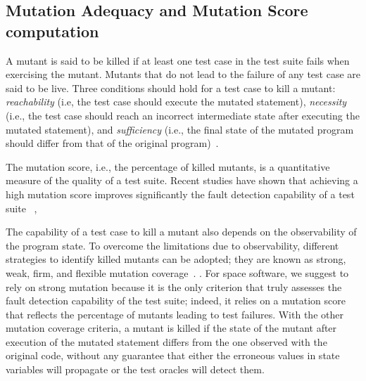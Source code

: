 \subsection{Mutation Adequacy and Mutation Score computation}
\label{background:adequacy}
A mutant is said to be killed if at least one test case in the test suite fails when exercising the mutant.
Mutants that do not lead to the failure of any test case are said to be live.
Three conditions should hold for a test case to kill a mutant: \emph{reachability} (i.e, the test case should execute the mutated statement), \emph{necessity} (i.e., the test case should reach an incorrect intermediate state after executing the mutated statement), and \emph{sufficiency} (i.e., the final state of the mutated program should differ from that of the original program)~\cite{offutt1997automatically}.

The mutation score, i.e., the percentage of killed mutants, is a quantitative measure of the quality of a test suite. Recent studies have shown that achieving a high mutation score improves significantly the fault detection capability of a test suite
~\cite{papadakis2018mutation},


The capability of a test case to kill a mutant also depends on the observability of the program state. To overcome the limitations due to observability, different strategies to identify killed mutants can be adopted; they are known as strong, weak, firm, and flexible mutation coverage~\cite{ammann2016introduction}.
.
For space software, we suggest to rely on strong mutation because it is the only criterion that truly assesses the fault detection capability of the test suite; indeed, it relies on a mutation score that reflects the percentage of mutants leading to test failures. With the other mutation coverage criteria, a mutant is killed if the state of the mutant after  execution of the mutated statement differs from the one observed with the original code, without any guarantee that either the erroneous values in state variables will propagate or the test oracles will detect them.




